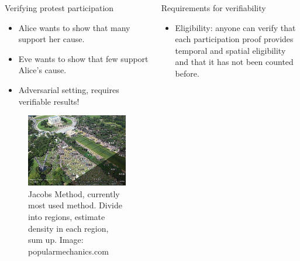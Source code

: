 \begin{columns}[t]

  \begin{column}{0.32\linewidth}

    \begin{redblock}{Verifying protest participation}
      \begin{itemize}
        \item Alice wants to show that many support her cause.
        \item Eve wants to show that few support Alice's cause.
        \item \color{red} Adversarial setting, requires verifiable results!
      \end{itemize}
    \end{redblock}

    \begin{figure}
      \centering
      \includegraphics[width=0.9\linewidth]{fig/Jacobs-method.jpg}
      \caption{%
        Jacobs Method, currently most used method.
        Divide into regions, estimate density in each region, sum up.
        Image: popularmechanics.com
      }\label{JacobsMethod}
    \end{figure}

  \end{column}

  \begin{column}{0.32\linewidth}

    \begin{blueblock}{Requirements for verifiability}
      \begin{itemize}
        \item\label{EligibilityVerif} Eligibility: anyone can verify that each 
          participation proof provides temporal and spatial eligibility and that 
          it has not been counted before.


\end{itemize}
\end{blueblock}
\end{column}
\end{columns}
